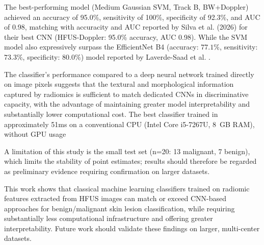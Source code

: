 \documentclass[12pt]{article}
\begin{document}
The best-performing model (Medium Gaussian SVM, Track B, BW+Doppler) achieved an accuracy of 95.0\%, sensitivity of 100\%, specificity of 92.3\%, and AUC of 0.98, matching with accuracity and AUC reported by Silva et al. (2026) for their best CNN (HFUS-Doppler: 95.0\% accuracy, AUC 0.98). While the SVM model also expressively surpass the EfficientNet B4 (accuracy: $77.1\%$, sensitivity: $73.3\%$, specificity: $80.0\%$) model reported by Laverde-Saad et al. \cite{LaverdeSaad2021}. 

The classifier's performance compared to a deep neural network trained directly on image pixels suggests that the textural and morphological information captured by radiomics is sufficient to match dedicated CNNs in discriminative capacity, with the advantage of maintaining greater model interpretability and substantially lower computational cost. The best classifier trained in approximately 51ms on a conventional CPU (Intel Core i5-7267U, 8~GB RAM), without GPU usage

A limitation of this study is the small test set (n=20: 13 malignant, 7 benign), which limits the stability of point estimates; results should therefore be regarded as preliminary evidence requiring confirmation on larger datasets.

This work shows that classical machine learning classifiers trained on radiomic features extracted from HFUS images can match or exceed CNN-based approaches for benign/malignant skin lesion classification, while requiring substantially less computational infrastructure and offering greater interpretability. Future work should validate these findings on larger, multi-center datasets.
\end{document}

